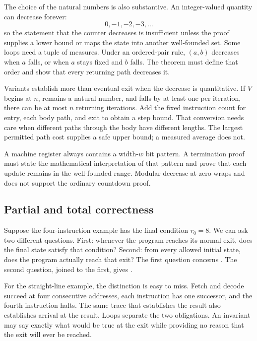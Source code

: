 The choice of the natural numbers is also substantive. An integer-valued
quantity can decrease forever:
\[
 0,-1,-2,-3,\ldots
\]
so the statement that the counter decreases is insufficient unless the proof
supplies a lower bound or maps the state into another well-founded set. Some
loops need a tuple of measures. Under an ordered-pair rule, \((a,b)\) decreases
when \(a\) falls, or when \(a\) stays fixed and \(b\) falls. The theorem must
define that order and show that every returning path decreases it.

Variants establish more than eventual exit when the decrease is quantitative.
If \(V\) begins at \(n\), remains a natural number, and falls by at least one
per iteration, there can be at most \(n\) returning iterations. Add the fixed
instruction count for entry, each body path, and exit to obtain a step bound.
That conversion needs care when different paths through the body have
different lengths. The largest permitted path cost supplies a safe upper
bound; a measured average does not.

\begin{warning}[title={A word is not automatically a natural variant}]
A machine register always contains a width-\(w\) bit pattern. A termination
proof must state the mathematical interpretation of that pattern and prove
that each update remains in the well-founded range. Modular decrease at zero
wraps and does not support the ordinary countdown proof.
\end{warning}

\subsection{Partial and total correctness}

Suppose the four-instruction example has the final condition \(r_0=8\). We can
ask two different questions. First: whenever the program reaches its normal
exit, does the final state satisfy that condition? Second: from every
allowed initial state, does the program actually reach that exit? The first
question concerns . The second question, joined
to the first, gives .

For the straight-line example, the distinction is easy to miss. Fetch and
decode succeed at four consecutive addresses, each instruction has one
successor, and the fourth instruction halts. The same trace that establishes
the result also establishes arrival at the result. Loops separate the two
obligations. An invariant may say exactly what would be true at the exit while
providing no reason that the exit will ever be reached.

